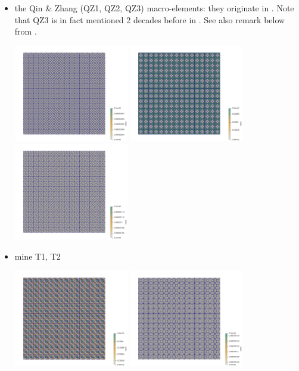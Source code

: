 \begin{itemize}
\item the Qin \& Zhang (QZ1, QZ2, QZ3) macro-elements: they originate in \cite{qizh07}.
Note that QZ3 is in fact mentioned 2 decades before in \cite{idsn95}. See also 
remark below from \cite{rovira1992}. 
\begin{center}
\includegraphics[width=5cm]{python_codes/fieldstone_78/images/16x16/area3.png}
\includegraphics[width=5cm]{python_codes/fieldstone_78/images/16x16/area4.png}
\includegraphics[width=5cm]{python_codes/fieldstone_78/images/16x16/area5.png}
\end{center}

\item mine T1, T2 

\begin{center}
\includegraphics[width=5cm]{python_codes/fieldstone_78/images/16x16/area6.png}
\includegraphics[width=5cm]{python_codes/fieldstone_78/images/16x16/area7.png}
\end{center}


\end{itemize}
